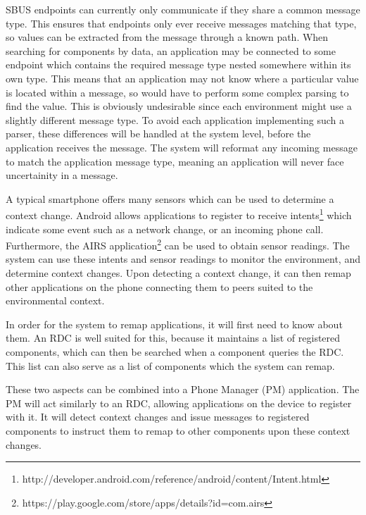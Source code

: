 \documentclass[12pt,twoside,notitlepage]{report}
\begin{document}
SBUS endpoints can currently only communicate if they share a common message type. 
This ensures that endpoints only ever receive messages matching that type, so values can be extracted from the message through a known path. 
When searching for components by data, an application may be connected to some endpoint which contains the required message type nested somewhere within its own type.
This means that an application may not know where a particular value is located within a message, so would have to perform some complex parsing to find the value. 
This is obviously undesirable since each environment might use a slightly different message type.
To avoid each application implementing such a parser, these differences will be handled at the system level, before the application receives the message. 
The system will reformat any incoming message to match the application message type, meaning an application will never face uncertainity in a message. 

A typical smartphone offers many sensors which can be used to determine a context change. 
Android allows applications to register to receive intents\footnote{http://developer.android.com/reference/android/content/Intent.html} which indicate some event such as a network change, or an incoming phone call. 
Furthermore, the AIRS application\footnote{https://play.google.com/store/apps/details?id=com.airs} can be used to obtain sensor readings.
The system can use these intents and sensor readings to monitor the environment, and determine context changes. 
Upon detecting a context change, it can then remap other applications on the phone connecting them to peers suited to the environmental context. 

In order for the system to remap applications, it will first need to know about them. 
An RDC is well suited for this, because it maintains a list of registered components, which can then be searched when a component queries the RDC. 
This list can also serve as a list of components which the system can remap.

These two aspects can be combined into a Phone Manager (PM) application. The PM will act similarly to an RDC, allowing applications on the device to register with it. It will detect context changes and issue messages to registered components to instruct them to remap to other components upon these context changes.
\end{document}

